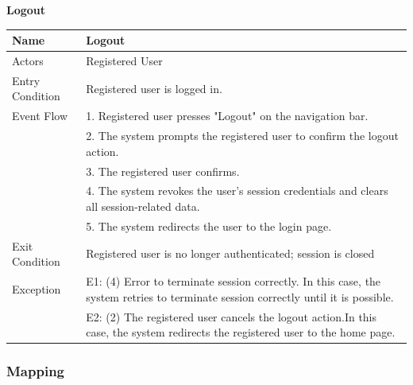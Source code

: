 \begin{enumerate}[label=\textbf{[UC\arabic*]}]
\begin{center}
        \end{center}
\newpage
        \item \textbf{Logout}
        \begin{center}
            \begin{tabular}{|p{4cm}|p{11cm}|}
                \hline
                \textbf{Name} & \textbf{Logout} \\
                \hline
                Actors & Registered User \\
                \hline
                Entry Condition & Registered user is logged in. \\
                \hline
                Event Flow & 1. Registered user presses "Logout" on the navigation bar. \\
                & 2. The system prompts the registered user to confirm the logout action. \\
                & 3. The registered user confirms. \\
                & 4. The system revokes the user’s session credentials and clears all session-related data.\\
                & 5. The system redirects the user to the login page. \\
                \hline
                Exit Condition & Registered user is no longer authenticated; session is closed \\
                \hline
                Exception & E1: (4) Error to terminate session correctly. \newline In this case, the system retries to terminate session correctly until it is possible.\\
                & E2: (2) The registered user cancels the logout action.\newline In this case, the system redirects the registered user to the home page.\\
                \hline
            \end{tabular}
        \end{center}
    
\end{enumerate}
\subsubsection{Mapping}

